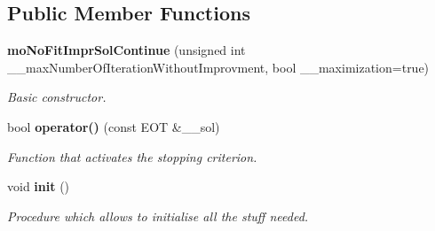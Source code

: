 \subsection*{Public Member Functions}
\begin{CompactItemize}
\item 
{\bf moNoFitImprSolContinue} (unsigned int \_\-\_\-maxNumberOfIterationWithoutImprovment, bool \_\-\_\-maximization=true)
\begin{CompactList}\small\item\em Basic constructor. \item\end{CompactList}\item 
bool {\bf operator()} (const EOT \&\_\-\_\-sol)
\begin{CompactList}\small\item\em Function that activates the stopping criterion. \item\end{CompactList}\item 
void {\bf init} ()\label{classmo_no_fit_impr_sol_continue_21641c0a38a4501baae6133cbc591de4}

\begin{CompactList}\small\item\em Procedure which allows to initialise all the stuff needed. \item\end{CompactList}\end{CompactItemize}
